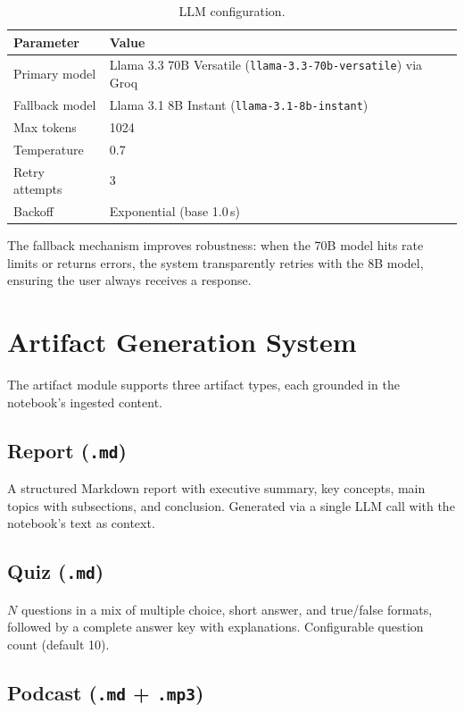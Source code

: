 \documentclass[11pt, letterpaper]{article}
\begin{document}
\begin{table}[H]
\centering\small
\begin{tabularx}{\textwidth}{@{}l X@{}}
\toprule
\textbf{Parameter} & \textbf{Value} \\
\midrule
Primary model   & Llama 3.3 70B Versatile (\texttt{llama-3.3-70b-versatile}) via Groq \\
Fallback model  & Llama 3.1 8B Instant (\texttt{llama-3.1-8b-instant}) \\
Max tokens      & 1024 \\
Temperature     & 0.7 \\
Retry attempts  & 3 \\
Backoff         & Exponential (base 1.0\,s) \\
\bottomrule
\end{tabularx}
\caption{LLM configuration.}
\end{table}

The fallback mechanism improves robustness: when the 70B model hits rate limits
or returns errors, the system transparently retries with the 8B model, ensuring
the user always receives a response.

\section{Artifact Generation System}

The artifact module supports three artifact types, each grounded in the
notebook's ingested content.

\subsection{Report (\texttt{.md})}

A structured Markdown report with executive summary, key concepts, main topics
with subsections, and conclusion.  Generated via a single LLM call with the
notebook's text as context.

\subsection{Quiz (\texttt{.md})}

$N$ questions in a mix of multiple choice, short answer, and true/false formats,
followed by a complete answer key with explanations.  Configurable question count
(default 10).

\subsection{Podcast (\texttt{.md} + \texttt{.mp3})}
\end{document}
